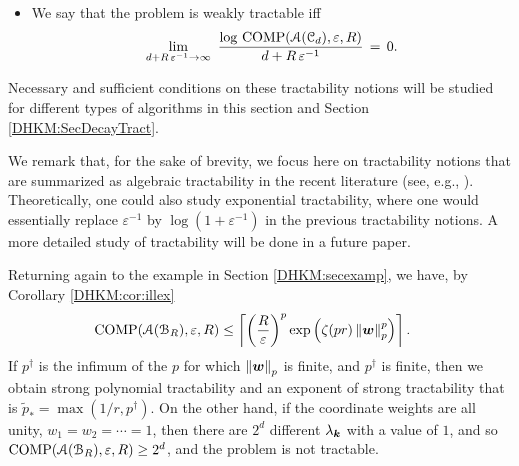 \documentclass[USenglish]{article}
\theoremstyle{dgthm}
\theoremstyle{dgthm}
\theoremstyle{dgthm}
\theoremstyle{dgthm}
\theoremstyle{dgdef}
\theoremstyle{definition}
\DeclareMathOperator{\COMP}{COMP}
\newcommand{\norm}[2][{}]{\ensuremath{\left \lVert #2 \right \rVert}_{#1}}
\begin{document}
{\begin{itemize}
   
\item   
We say that the problem is weakly tractable iff    
$$   
\lim_{d+R\,\varepsilon^{-1}\to\infty}\   
\frac{\log\, \COMP(\calA(\calC_d), \varepsilon,R)}   
{d+R\,\varepsilon^{-1}}\,=\,0.   
$$    
\end{itemize}   
Necessary and sufficient conditions on these tractability notions will be studied 
for different types of algorithms in this section and Section \ref{DHKM:SecDecayTract}. 

We remark that, for the sake of brevity, we focus here on tractability notions that are summarized as 
algebraic tractability in the recent literature 
(see, e.g., \cite{KriWoz19}). Theoretically, one could also study exponential tractability, where 
one would essentially replace $\varepsilon^{-1}$ 
by $\log (1 + \varepsilon^{-1})$ in the previous tractability notions. A more detailed study of 
tractability will be done in a future paper.

Returning again to the example in Section \ref{DHKM:secexamp}, we have, by Corollary \ref{DHKM:cor:illex}
\begin{align*}
    \MoveEqLeft{\COMP(\calA(\calB_{R}),\varepsilon,R)} 
  \le \left \lceil \left( \frac{R}{\varepsilon} \right)^{p}  \exp\left(\zeta(p r) \norm[p]{\bsw}^p  \right) \right \rceil .
\end{align*}
If $p^\dagger$ is the infimum of the $p$ for which $\norm[p]{\bsw}$ is finite, and $p^\dagger$ is finite, then we obtain strong polynomial tractability and an exponent of strong tractability that is $\widetilde{p}_* = \max(1/r,p^\dagger)$. On the other hand, if the coordinate weights are all unity,  $w_1 = w_2 = \cdots = 1$, then there are $2^d$ different $\lambda_{{\boldsymbol{k}}}$ with a value of $1$, and so $\COMP(\calA(\calB_{R}),\varepsilon,R) \ge 2^d$, and the problem is not tractable.\\

}
\end{document}
